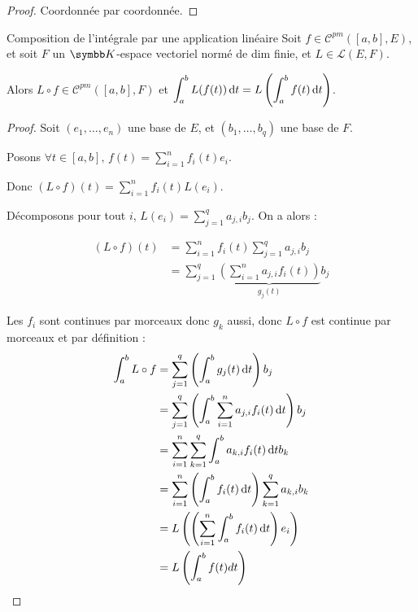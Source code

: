 \begin{proof}
    Coordonnée par coordonnée.
\end{proof}


\begin{theoreme}{Composition de l'intégrale par une application linéaire}{}
    Soit $f \in \mathscr C^{pm}([a, b], E)$, et soit $F$ un $\K$-espace vectoriel normé de dim finie, et 
    $L \in \mathscr L(E, F)$.

    Alors $L \circ f \in \mathscr C^{pm}([a, b], F)$ et $\displaystyle \int_a^b L(f(t)) \,\mathrm{d}t = L\left( \int_a^b f(t) \,\mathrm{d}t \right)$.
\end{theoreme}


\begin{proof}
    Soit $(e_1, \ldots, e_n)$ une base de $E$, et $(b_1, \ldots, b_q)$ une base de $F$.

    Posons $\displaystyle \forall t \in [a, b], \, f(t) = \sum_{i=1}^n f_i(t)e_i$.

    Donc $\displaystyle (L \circ f)(t) = \sum_{i=1}^n f_i(t)L(e_i)$.

    Décomposons pour tout $i$, $\displaystyle L(e_i) = \sum_{j=1}^q a_{j, i} b_j$.
    On a alors :

    \begin{align*}
        (L \circ f) (t) & = \sum_{i=1}^n f_i(t) \sum_{j=1}^q a_{j, i} b_j \\
        & = \sum_{j=1}^q \underbrace{\left( \sum_{i=1}^n a_{j, i} f_i(t) \right)}_{g_j(t)} b_j
    \end{align*}

    Les $f_i$ sont continues par morceaux donc $g_k$ aussi, donc $L \circ f$ est continue par morceaux et par définition : 
    {\allowdisplaybreaks
    \begin{align*}
        \int_a^b L \circ f & = \sum_{j=1}^q \left( \int_a^b g_j(t) \,\mathrm{d}t \right) b_j \\
        & = \sum_{j=1}^q \left( \int_a^b \sum_{i=1}^n a_{j, i} f_i(t) \,\mathrm{d}t \right) b_j \\
        & = \sum_{i = 1}^n \sum_{k = 1 }^{q } \int_{a }^{b } a_{k, i} f_i(t) \,\mathrm{d}t b_k \\
        & = \sum_{i=1}^n \left( \int_a^b f_i(t) \,\mathrm{d}t \right) \sum_{k=1}^q a_{k, i} b_k \\
        & = L \left(\left(\sum_{i = 1 }^{n } \int_{a }^{b } f_i(t) \,\mathrm{d}t\right) e_i\right) \\
        & = L \left( \int_a^b f(t) dt \right)
    \end{align*}
    }
\end{proof}

